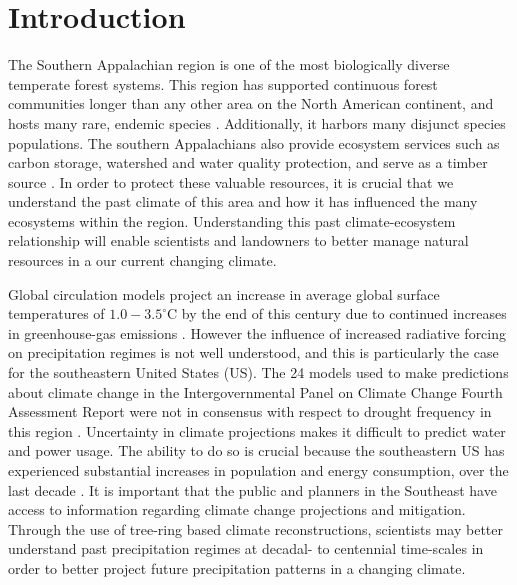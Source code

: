 \section{Introduction}


The Southern Appalachian region is one of the most biologically diverse
temperate forest systems.  This region has supported continuous forest
communities longer than any other area on the North American continent,
and hosts many rare, endemic species \cite{NCNHP2012}. Additionally,
it harbors many disjunct species populations. The southern
Appalachians also provide ecosystem services such as carbon storage,
watershed and water quality protection, and serve as a timber source
\cite{zipper2011restoring}. In order to protect these valuable resources,
it is crucial that we understand the past climate of this
area and how it has influenced the many ecosystems within the region.
Understanding this past climate-ecosystem relationship will enable scientists and landowners
to better manage natural resources in a our current changing climate.

Global circulation models project an increase in average global surface
temperatures of $1.0-3.5^{\circ}$C by the end of this century due to
continued increases in greenhouse-gas emissions \cite{pachauri2007climate,
kattenberg1996climate}. However the influence of increased radiative
forcing on precipitation regimes is not well understood, and this is
particularly the case for the southeastern United States (US). The
24 models used to make predictions about climate change in the
Intergovernmental Panel on Climate Change Fourth Assessment Report
were not in consensus with respect to drought frequency in this region
\cite{pachauri2007climate, seager2009drought}.  Uncertainty in climate
projections makes it difficult to predict water and power usage. The
ability to do so is crucial because the southeastern US has experienced
substantial increases in population and energy consumption, over the last
decade \cite{seager2009drought, sobolowski2012evaluation}. It is important
that the public and planners in the Southeast have access to information
regarding climate change projections and mitigation. Through the use of
tree-ring based climate reconstructions, scientists may better understand
past precipitation regimes at decadal- to centennial time-scales in order
to better project future precipitation patterns in a changing climate.


